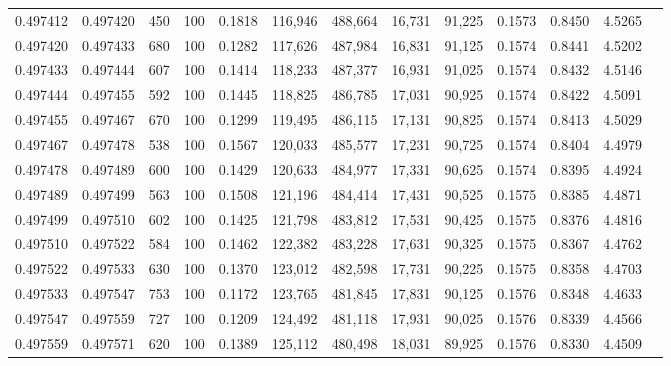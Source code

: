 \begin{tabular}{rrrrrrrrrrrrr}
0.497412 & 0.497420 &   450 & 100 &                                     0.1818 & 116,946 & 488,664 &  16,731 &  91,225 & 0.1573 & 0.8450 & 4.5265 \\
0.497420 & 0.497433 &   680 & 100 &                                     0.1282 & 117,626 & 487,984 &  16,831 &  91,125 & 0.1574 & 0.8441 & 4.5202 \\
0.497433 & 0.497444 &   607 & 100 &                                     0.1414 & 118,233 & 487,377 &  16,931 &  91,025 & 0.1574 & 0.8432 & 4.5146 \\
0.497444 & 0.497455 &   592 & 100 &                                     0.1445 & 118,825 & 486,785 &  17,031 &  90,925 & 0.1574 & 0.8422 & 4.5091 \\
0.497455 & 0.497467 &   670 & 100 &                                     0.1299 & 119,495 & 486,115 &  17,131 &  90,825 & 0.1574 & 0.8413 & 4.5029 \\
0.497467 & 0.497478 &   538 & 100 &                                     0.1567 & 120,033 & 485,577 &  17,231 &  90,725 & 0.1574 & 0.8404 & 4.4979 \\
0.497478 & 0.497489 &   600 & 100 &                                     0.1429 & 120,633 & 484,977 &  17,331 &  90,625 & 0.1574 & 0.8395 & 4.4924 \\
0.497489 & 0.497499 &   563 & 100 &                                     0.1508 & 121,196 & 484,414 &  17,431 &  90,525 & 0.1575 & 0.8385 & 4.4871 \\
0.497499 & 0.497510 &   602 & 100 &                                     0.1425 & 121,798 & 483,812 &  17,531 &  90,425 & 0.1575 & 0.8376 & 4.4816 \\
0.497510 & 0.497522 &   584 & 100 &                                     0.1462 & 122,382 & 483,228 &  17,631 &  90,325 & 0.1575 & 0.8367 & 4.4762 \\
0.497522 & 0.497533 &   630 & 100 &                                     0.1370 & 123,012 & 482,598 &  17,731 &  90,225 & 0.1575 & 0.8358 & 4.4703 \\
0.497533 & 0.497547 &   753 & 100 &                                     0.1172 & 123,765 & 481,845 &  17,831 &  90,125 & 0.1576 & 0.8348 & 4.4633 \\
0.497547 & 0.497559 &   727 & 100 &                                     0.1209 & 124,492 & 481,118 &  17,931 &  90,025 & 0.1576 & 0.8339 & 4.4566 \\
0.497559 & 0.497571 &   620 & 100 &                                     0.1389 & 125,112 & 480,498 &  18,031 &  89,925 & 0.1576 & 0.8330 & 4.4509 \\

\end{tabular}
